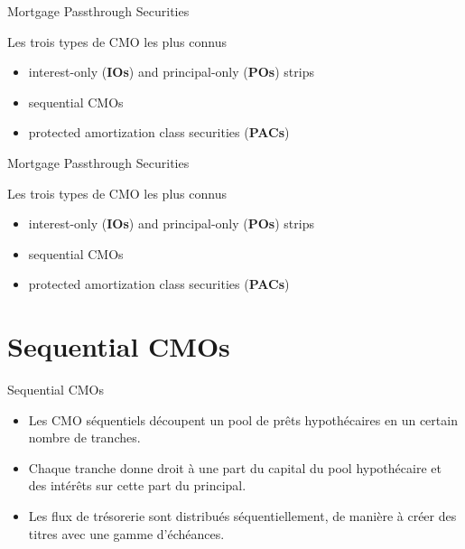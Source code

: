 \documentclass{beamer}
\begin{document}
\begin{frame}{Mortgage Passthrough Securities}
\begin{block}{Les trois types de CMO les plus connus}
\begin{itemize}[label=\bullet]
\item interest-only (\textbf{IOs}) and principal-only (\textbf{POs}) strips

\item sequential CMOs

\item protected amortization class securities (\textbf{PACs})
\end{itemize}
\end{block}
\end{frame}


\begin{frame}{Mortgage Passthrough Securities}
\begin{block}{Les trois types de CMO les plus connus}
\begin{itemize}[label=\bullet]
\item interest-only (\textbf{IOs}) and principal-only (\textbf{POs}) strips
\item sequential CMOs
\item protected amortization class securities (\textbf{PACs})
\end{itemize}
\end{block}
\end{frame}

\section{Sequential CMOs}

\begin{frame}{Sequential CMOs}
\begin{itemize}[label=\bullet]
\item Les CMO séquentiels découpent un pool de prêts hypothécaires en un certain nombre de tranches.

\vspace{0.5cm}

\item Chaque tranche donne droit à une part du capital du pool hypothécaire et des intérêts sur cette part du principal.

\vspace{0.5cm}

\item Les flux de trésorerie sont distribués séquentiellement, de manière à créer des titres avec une gamme d'échéances.
\end{itemize}
\end{frame}
\end{document}
